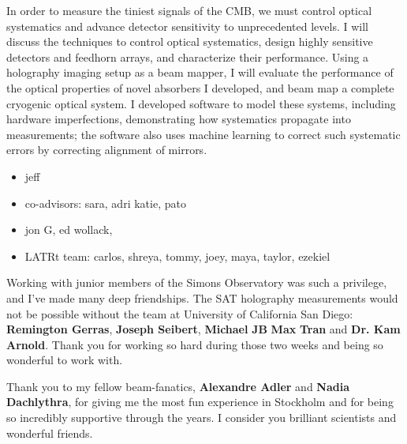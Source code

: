 \documentclass{ucetd}
\begin{document}
In order to measure the tiniest signals of the CMB, we must control optical systematics and advance detector sensitivity to unprecedented levels. I will discuss the techniques to control optical systematics, design highly sensitive detectors and feedhorn arrays, and characterize their performance. Using a holography imaging setup as a beam mapper, I will evaluate the performance of the optical properties of novel absorbers I developed, and beam map a complete cryogenic optical system. I developed software to model these systems,  including hardware imperfections, demonstrating how systematics propagate into measurements; the software also uses machine learning to correct such systematic errors by correcting alignment of mirrors. 


\mainmatter











\appendix







\acknowledgments


\begin{itemize}
        \item jeff
        \item co-advisors: sara, adri katie, pato
        \item jon G, ed wollack,
        \item LATRt team: carlos, shreya, tommy, joey, maya, taylor, ezekiel
\end{itemize}
    
Working with junior members of the Simons Observatory was such a privilege, and I've made many deep friendships. The SAT holography measurements would not be possible without the team at University of California San Diego: \textbf{Remington Gerras}, \textbf{Joseph Seibert}, \textbf{Michael} \textbf{JB} \textbf{Max} \textbf{Tran} and \textbf{Dr. Kam Arnold}.  Thank you for working so hard during those two weeks and being so wonderful to work with.  

Thank you to my fellow beam-fanatics, \textbf{Alexandre Adler} and \textbf{Nadia Dachlythra}, for giving me the most fun experience in Stockholm and for being so incredibly supportive through the years.  I consider you brilliant scientists and wonderful friends.   
\end{document}
